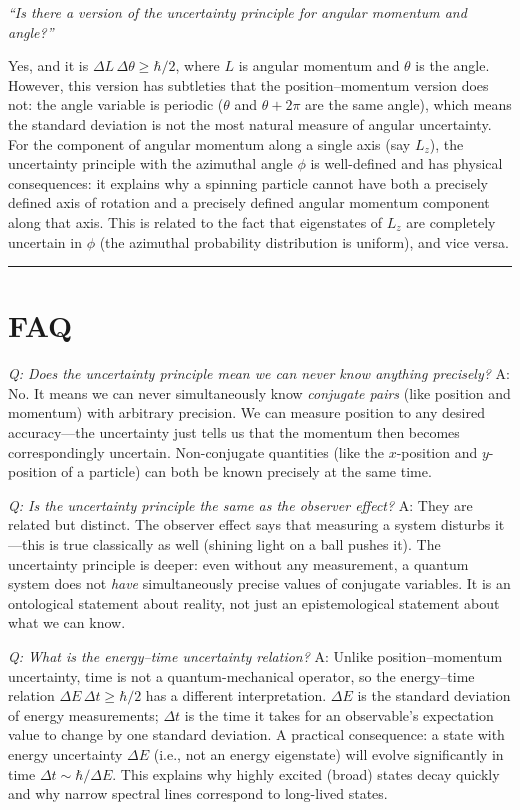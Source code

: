 \textit{``Is there a version of the uncertainty principle for angular momentum and angle?''}

Yes, and it is $\Delta L\,\Delta\theta \geq \hbar/2$, where $L$ is angular momentum and $\theta$ is the angle. However, this version has subtleties that the position--momentum version does not: the angle variable is periodic ($\theta$ and $\theta + 2\pi$ are the same angle), which means the standard deviation is not the most natural measure of angular uncertainty. For the component of angular momentum along a single axis (say $L_z$), the uncertainty principle with the azimuthal angle $\phi$ is well-defined and has physical consequences: it explains why a spinning particle cannot have both a precisely defined axis of rotation and a precisely defined angular momentum component along that axis. This is related to the fact that eigenstates of $L_z$ are completely uncertain in $\phi$ (the azimuthal probability distribution is uniform), and vice versa.

\bigskip
\hrule
\bigskip
\section*{FAQ}

\textit{Q: Does the uncertainty principle mean we can never know anything precisely?}
A: No. It means we can never simultaneously know \emph{conjugate pairs} (like position and momentum) with arbitrary precision. We can measure position to any desired accuracy---the uncertainty just tells us that the momentum then becomes correspondingly uncertain. Non-conjugate quantities (like the $x$-position and $y$-position of a particle) can both be known precisely at the same time.

\textit{Q: Is the uncertainty principle the same as the observer effect?}
A: They are related but distinct. The observer effect says that measuring a system disturbs it---this is true classically as well (shining light on a ball pushes it). The uncertainty principle is deeper: even without any measurement, a quantum system does not \emph{have} simultaneously precise values of conjugate variables. It is an ontological statement about reality, not just an epistemological statement about what we can know.

\textit{Q: What is the energy--time uncertainty relation?}
A: Unlike position--momentum uncertainty, time is not a quantum-mechanical operator, so the energy--time relation $\Delta E\,\Delta t \geq \hbar/2$ has a different interpretation. $\Delta E$ is the standard deviation of energy measurements; $\Delta t$ is the time it takes for an observable's expectation value to change by one standard deviation. A practical consequence: a state with energy uncertainty $\Delta E$ (i.e., not an energy eigenstate) will evolve significantly in time $\Delta t \sim \hbar/\Delta E$. This explains why highly excited (broad) states decay quickly and why narrow spectral lines correspond to long-lived states.
